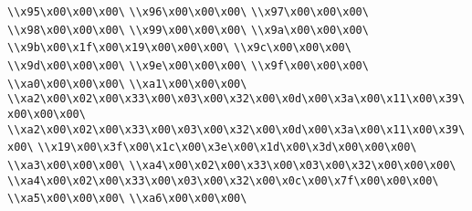 \verb|\\x95\x00\x00\x00\|\newline
\verb|\\x96\x00\x00\x00\|\newline
\verb|\\x97\x00\x00\x00\|\newline
\verb|\\x98\x00\x00\x00\|\newline
\verb|\\x99\x00\x00\x00\|\newline
\verb|\\x9a\x00\x00\x00\|\newline
\verb|\\x9b\x00\x1f\x00\x19\x00\x00\x00\|\newline
\verb|\\x9c\x00\x00\x00\|\newline
\verb|\\x9d\x00\x00\x00\|\newline
\verb|\\x9e\x00\x00\x00\|\newline
\verb|\\x9f\x00\x00\x00\|\newline
\verb|\\xa0\x00\x00\x00\|\newline
\verb|\\xa1\x00\x00\x00\|\newline
\verb|\\xa2\x00\x02\x00\x33\x00\x03\x00\x32\x00\x0d\x00\x3a\x00\x11\x00\x39\x00\x00\x00\|\newline
\verb|\\xa2\x00\x02\x00\x33\x00\x03\x00\x32\x00\x0d\x00\x3a\x00\x11\x00\x39\x00\|\newline
\verb|\\x19\x00\x3f\x00\x1c\x00\x3e\x00\x1d\x00\x3d\x00\x00\x00\|\newline
\verb|\\xa3\x00\x00\x00\|\newline
\verb|\\xa4\x00\x02\x00\x33\x00\x03\x00\x32\x00\x00\x00\|\newline
\verb|\\xa4\x00\x02\x00\x33\x00\x03\x00\x32\x00\x0c\x00\x7f\x00\x00\x00\|\newline
\verb|\\xa5\x00\x00\x00\|\newline
\verb|\\xa6\x00\x00\x00\|\newline

